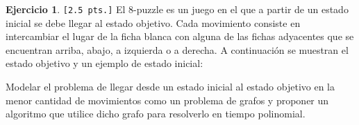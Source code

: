 \documentclass[a4paper,oneside,12pt]{amsart}
\theoremstyle{definition}
\newtheorem{quest}{Ejercicio}
\begin{document}
\begin{quest} \verb|[2.5 pts.]| El 8-puzzle es un juego en el que a partir de un estado inicial se debe llegar al estado objetivo. Cada movimiento consiste en intercambiar el lugar de la ficha blanca con alguna de las fichas adyacentes que se encuentran arriba, abajo, a izquierda o a derecha. A continuación se muestran el estado objetivo y un ejemplo de estado inicial:

\begin{center}
\end{center}
Modelar el problema de llegar desde un estado inicial al estado objetivo en la menor cantidad de movimientos como un problema de grafos y proponer un algoritmo que utilice dicho grafo para resolverlo en tiempo polinomial.
\end{quest}


\end{document}
